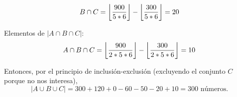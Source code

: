 \begin{solution}
$$B\cap C=\floor*{\frac{900}{5*6}}-\floor*{\frac{300}{5*6}}=20$$

Elementos de $|A\cap B\cap C|$: 
$$A\cap B\cap C=\floor*{\frac{900}{2*5*6}}-\floor*{\frac{300}{2*5*6}}=10$$

\linita

Entonces, por el principio de inclusión-exclusión (excluyendo el conjunto $C$ porque no nos interesa), 
$$|A\cup B\cup C|= 300+120+0-60-50-20+10=300 \text{ números.}$$



\end{solution}